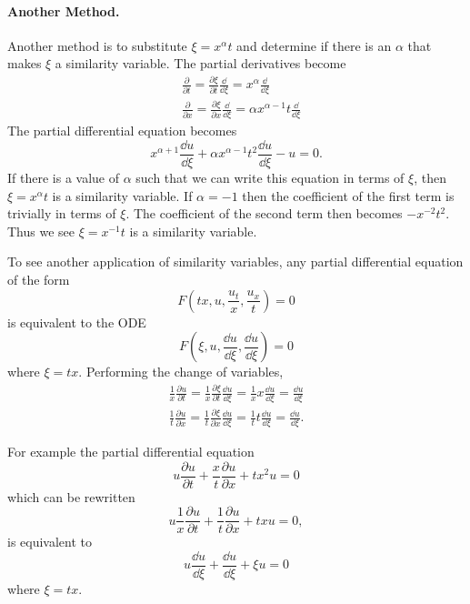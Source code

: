 \begin{Example}
  \paragraph{Another Method.}  Another method
  is to substitute $\xi = x^\alpha t$ and determine if there is an $\alpha$ that
  makes $\xi$ a similarity variable.  The partial derivatives become
  \begin{align*}
    &\frac{\partial}{\partial t} = \frac{\partial \xi}{\partial t} \frac{\dd}{\dd \xi} = x^\alpha \frac{\dd}{\dd \xi} \\
    &\frac{\partial}{\partial x} = \frac{\partial \xi}{\partial x} \frac{\dd}{\dd \xi}
    = \alpha x^{\alpha-1} t \frac{\dd}{\dd \xi}
  \end{align*}
  The partial differential equation becomes
  \[ x^{\alpha+1} \frac{\dd u}{\dd \xi} + \alpha x^{\alpha-1} t^2 \frac{\dd u}{\dd \xi}
  - u = 0.\]
  If there is a value of $\alpha$ such that we can write this equation in terms
  of $\xi$, then $\xi = x^\alpha t$ is a similarity variable.  If $\alpha = -1$
  then the coefficient of the first term is trivially in terms of $\xi$.
  The coefficient of the second term then becomes $-x^{-2} t^2$.  Thus we see
  $\xi = x^{-1}t$ is a similarity variable.
\end{Example}





\begin{Example}
  To see another application of similarity variables, any
  partial differential equation of the form
  \[F \left( tx, u, \frac{u_t}{x}, \frac{u_x}{t} \right) = 0 \]
  is equivalent to the ODE
  \[ F \left( \xi, u, \frac{\dd u}{\dd \xi}, \frac{\dd u}{\dd \xi} \right) = 0\]
  where $\xi = tx$.  Performing the change of variables,
  \begin{gather*}
    \frac{1}{x} \frac{\partial u}{\partial t} = \frac{1}{x} \frac{\partial \xi}{\partial t} \frac{\dd u}{\dd \xi} =
    \frac{1}{x} x \frac{\dd u}{\dd \xi} = \frac{\dd u}{\dd \xi} \\
    \frac{1}{t} \frac{\partial u}{\partial x} = \frac{1}{t} \frac{\partial \xi}{\partial x} \frac{\dd u}{\dd \xi} =
    \frac{1}{t} t \frac{\dd u}{\dd \xi} = \frac{\dd u}{\dd \xi}.
  \end{gather*}

  For example the partial differential equation
  \[u \frac{\partial u}{\partial t} + \frac{x}{t} \frac{\partial u}{\partial x} + tx^2 u = 0 \]
  which can be rewritten
  \[u \frac{1}{x}\frac{\partial u}{\partial t} + \frac{1}{t} \frac{\partial u}{\partial x} + tx u = 0, \]
  is equivalent to
  \[ u \frac{\dd u}{\dd \xi} + \frac{\dd u}{\dd \xi} + \xi u = 0 \]
  where $\xi = t x$.
\end{Example}





















